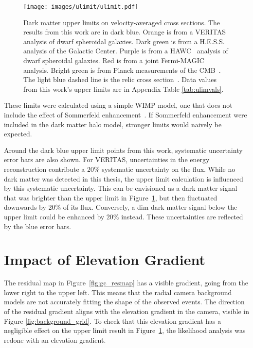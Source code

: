 \begin{figure}[tb]
  \centering
  \texttt{[image: images/ulimit/ulimit.pdf]}
  \caption[Dark Matter Upper Limit]{
    Dark matter upper limits on velocity-averaged cross sections.
    The results from this work are in dark blue.
    Orange is from a VERITAS~\cite{veritas_dm_limit} analysis of dwarf spheroidal galaxies.
    Dark green is from a H.E.S.S.~\cite{hess_dm_limit} analysis of the Galactic Center.
    Purple is from a HAWC~\cite{hawc_dm_limit} analysis of dwarf spheroidal galaxies.
    Red is from a joint Fermi-MAGIC~\cite{fermagicul} analysis.
    Bright green is from Planck measurements of the CMB~\cite{planck_dm_limit}.
    The light blue dashed line is the relic cross section~\cite{updatedWIMPRelicCrossSection}.
    Data values from this work's upper limits are in Appendix Table \ref{tab:ulimvals}.
  }
  \label{fig:ulim}
\end{figure}

These limits were calculated using a simple WIMP model, one that does not include the effect of Sommerfeld enhancement~\cite{sommerfeld}.
If Sommerfeld enhancement were included in the dark matter halo model, stronger limits would naively be expected.

Around the dark blue upper limit points from this work, systematic uncertainty error bars are also shown.
For VERITAS, uncertainties in the energy reconstruction contribute a \nicetilde{}20\% systematic uncertainty on the flux.
While no dark matter was detected in this thesis, the upper limit calculation is influenced by this systematic uncertainty.
This can be envisioned as a dark matter signal that was brighter than the upper limit in Figure~\ref{fig:ulim}, but then fluctuated downwards by 20\% of its flux.
Conversely, a dim dark matter signal below the upper limit could be enhanced by 20\% instead.
These uncertainties are reflected by the blue error bars.

\FloatBarrier

\section{Impact of Elevation Gradient}\label{sec:elevgradient}

The residual map in Figure~\ref{fig:gc_resmap} has a visible gradient, going from the lower right to the upper left.
This means that the radial camera background models are not accurately fitting the shape of the observed events.
The direction of the residual gradient aligns with the elevation gradient in the camera, visible in Figure \ref{fig:background_grid}.
To check that this elevation gradient has a negligible effect on the upper limit result in Figure~\ref{fig:ulim}, the likelihood analysis was redone with an elevation gradient.

